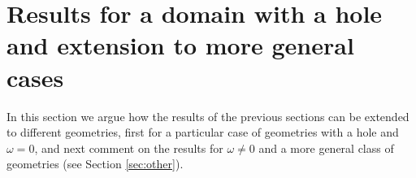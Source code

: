 \documentclass[report]{elsarticle}
\numberwithin{theorem}{section}
\begin{document}
\section{Results for a domain with a hole and extension to more general cases}
\label{sec:general_geometries}
In this section we argue how the results of the previous sections can be extended to different geometries, first for a particular case of geometries with a hole and $\omega=0$, and next comment on the results for $\omega\neq 0$ and a more general class of geometries (see Section \ref{sec:other}).  
\end{document}
